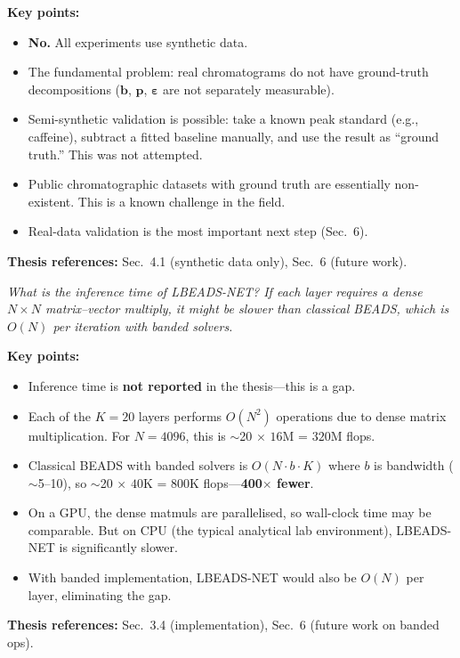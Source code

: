 \documentclass[11pt, letterpaper]{article}
\newcounter{qcounter}
\newcommand{\question}[1]{%
  \stepcounter{qcounter}%
  \begin{questionbox}[Q\theqcounter]%
    \itshape #1%
  \end{questionbox}%
}
\begin{document}
\begin{answerbox}
\textbf{Key points:}
\begin{itemize}[nosep]
  \item \textbf{No.}  All experiments use synthetic data.
  \item The fundamental problem: real chromatograms do not have
        ground-truth decompositions ($\mathbf{b}$, $\mathbf{p}$,
        $\boldsymbol{\varepsilon}$ are not separately measurable).
  \item Semi-synthetic validation is possible: take a known peak
        standard (e.g., caffeine), subtract a fitted baseline
        manually, and use the result as ``ground truth.''  This
        was not attempted.
  \item Public chromatographic datasets with ground truth are
        essentially non-existent.  This is a known challenge in
        the field.
  \item Real-data validation is the most important next step (Sec.~6).
\end{itemize}
\textbf{Thesis references:} Sec.~4.1 (synthetic data only), Sec.~6 (future work).
\end{answerbox}

\question{What is the inference time of LBEADS-NET?  If each layer requires
a dense $N \times N$ matrix--vector multiply, it might be slower
than classical BEADS, which is $O(N)$ per iteration with banded
solvers.}

\begin{answerbox}
\textbf{Key points:}
\begin{itemize}[nosep]
  \item Inference time is \textbf{not reported} in the thesis---this
        is a gap.
  \item Each of the $K{=}20$ layers performs $O(N^2)$ operations
        due to dense matrix multiplication.  For $N{=}4096$, this
        is $\sim$20 $\times$ $16\text{M}$ = $320\text{M}$ flops.
  \item Classical BEADS with banded solvers is $O(N \cdot b \cdot K)$
        where $b$ is bandwidth ($\sim$5--10), so $\sim$20 $\times$
        $40\text{K}$ = $800\text{K}$ flops---\textbf{400$\times$ fewer}.
  \item On a GPU, the dense matmuls are parallelised, so wall-clock
        time may be comparable.  But on CPU (the typical analytical
        lab environment), LBEADS-NET is significantly slower.
  \item With banded implementation, LBEADS-NET would also be $O(N)$
        per layer, eliminating the gap.
\end{itemize}
\textbf{Thesis references:} Sec.~3.4 (implementation), Sec.~6 (future work on banded ops).
\end{answerbox}
\end{document}
